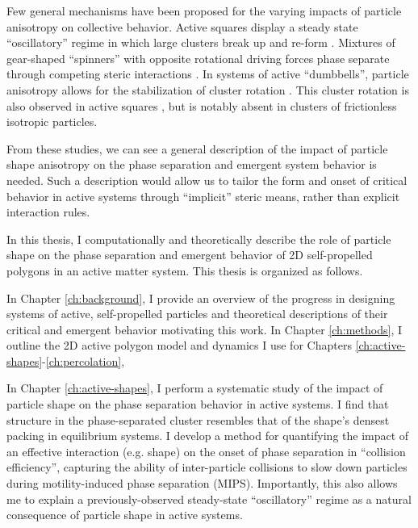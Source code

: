 Few general mechanisms have been proposed for the varying impacts of particle anisotropy on collective behavior.
Active squares display a steady state ``oscillatory'' regime in which large clusters break up and re-form \cite{Prymidis_2016_SoftMatter}.
Mixtures of gear-shaped ``spinners'' with opposite rotational driving forces phase separate through competing steric interactions \cite{Nguyen_2014_PRL, Sabrina_2015_SoftMatter, Spellings_2015_PNAS}.
In systems of active ``dumbbells'', particle anisotropy allows for the stabilization of cluster rotation \cite{Suma_2014_EPL, Cugliandolo_2017_PRL}.
This cluster rotation is also observed in active squares \cite{Prymidis_2016_SoftMatter}, but is notably absent in clusters of frictionless isotropic particles.

From these studies, we can see a general description of the impact of particle shape anisotropy on the phase separation and emergent system behavior is needed.
Such a description would allow us to tailor the form and onset of critical behavior in active systems through ``implicit'' steric means, rather than explicit interaction rules.

In this thesis, I computationally and theoretically describe the role of particle shape on the phase separation and emergent behavior of 2D self-propelled polygons in an active matter system.
This thesis is organized as follows.

In Chapter \ref{ch:background}, I provide an overview of the progress in designing systems of active, self-propelled particles and theoretical descriptions of their critical and emergent behavior motivating this work. In Chapter \ref{ch:methods}, I outline the 2D active polygon model and dynamics I use for Chapters \ref{ch:active-shapes}-\ref{ch:percolation},

In Chapter \ref{ch:active-shapes}, I perform a systematic study of the impact of particle shape on the phase separation behavior in active systems. I find that structure in the phase-separated cluster resembles that of the shape's densest packing in equilibrium systems. I develop a method for quantifying the impact of an effective interaction (e.g. shape) on the onset of phase separation in ``collision efficiency'', capturing the ability of inter-particle collisions to slow down particles during motility-induced phase separation (MIPS). Importantly, this also allows me to explain a previously-observed steady-state ``oscillatory'' regime as a natural consequence of particle shape in active systems.

